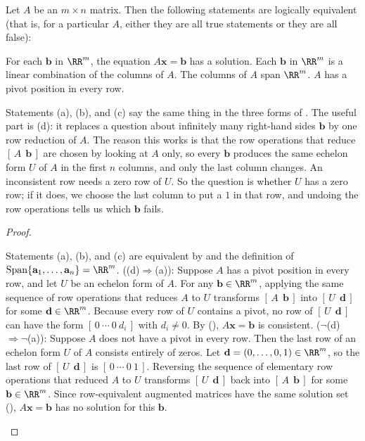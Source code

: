 \documentclass[10pt]{scrartcl}
\newcommand{\vv}[1]{\mathbf{#1}}
\DeclareMathOperator{\spn}{Span}
\begin{document}
\begin{theorem*}
  Let $A$ be an $m\times n$ matrix. Then the following statements are logically equivalent (that is, for a particular $A$, either they are all true statements or they are all false):
  \begin{enumerate}[(a)]
    \ii For each $\vv b$ in $\RR^m$, the equation $A\vv x=\vv b$ has a solution.
    \ii Each $\vv b$ in $\RR^m$ is a linear combination of the columns of $A$.
    \ii The columns of $A$ span $\RR^m$.
    \ii $A$ has a pivot position in every row.
  \end{enumerate}
\end{theorem*}
\begin{ideabox}
  Statements (a), (b), and (c) say the same thing in the three forms of . The useful part is (d): it replaces a question about infinitely many right-hand sides $\vv b$ by one row reduction of $A$. The reason this works is that the row operations that reduce $[\,A\ \ \vv b\,]$ are chosen by looking at $A$ only, so every $\vv b$ produces the same echelon form $U$ of $A$ in the first $n$ columns, and only the last column changes. An inconsistent row needs a zero row of $U$. So the question is whether $U$ has a zero row; if it does, we choose the last column to put a $1$ in that row, and undoing the row operations tells us which $\vv b$ fails.
\end{ideabox}
\begin{proof}
  \begin{steps}
    \ii Statements (a), (b), and (c) are equivalent by  and the definition of $\spn\{\vv a_1,\dots,\vv a_n\}=\RR^m$.
    \ii ((d)$\Rightarrow$(a)): Suppose $A$ has a pivot position in every row, and let $U$ be an echelon form of $A$. For any $\vv b\in\RR^m$, applying the same sequence of row operations that reduces $A$ to $U$ transforms $[\,A\ \ \vv b\,]$ into $[\,U\ \ \vv d\,]$ for some $\vv d\in\RR^m$. Because every row of $U$ contains a pivot, no row of $[\,U\ \ \vv d\,]$ can have the form $[\,0\ \cdots\ 0\ d_i\,]$ with $d_i\ne 0$. By (), $A\vv x=\vv b$ is consistent.
    \ii ($\neg$(d)$\Rightarrow\neg$(a)): Suppose $A$ does not have a pivot in every row. Then the last row of an echelon form $U$ of $A$ consists entirely of zeros. Let $\vv d=(0,\dots,0,1)\in\RR^m$, so the last row of $[\,U\ \ \vv d\,]$ is $[\,0\ \cdots\ 0\ 1\,]$. Reversing the sequence of elementary row operations that reduced $A$ to $U$ transforms $[\,U\ \ \vv d\,]$ back into $[\,A\ \ \vv b\,]$ for some $\vv b\in\RR^m$. Since row-equivalent augmented matrices have the same solution set (), $A\vv x=\vv b$ has no solution for this $\vv b$.
  \end{steps}
\end{proof}
\end{document}
